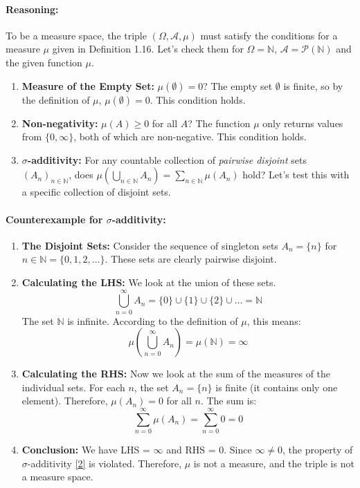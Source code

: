 \documentclass[11pt,a4paper]{article}
\begin{document}
\paragraph{Reasoning:}
To be a measure space, the triple $(\Omega, \mathcal{A}, \mu)$ must satisfy the conditions for a measure $\mu$ given in Definition 1.16. Let's check them for $\Omega=\mathbb{N}$, $\mathcal{A}=\mathcal{P}(\mathbb{N})$ and the given function $\mu$.
\begin{enumerate}
    \item \textbf{Measure of the Empty Set:} $\mu(\emptyset) = 0$? The empty set $\emptyset$ is finite, so by the definition of $\mu$, $\mu(\emptyset) = 0$. This condition holds.
    \item \textbf{Non-negativity:} $\mu(A) \geq 0$ for all $A$? The function $\mu$ only returns values from $\{0, \infty\}$, both of which are non-negative. This condition holds.
    \item \textbf{$\sigma$-additivity:} For any countable collection of \emph{pairwise disjoint} sets $(A_n)_{n \in \mathbb{N}}$, does $\mu(\bigcup_{n \in \mathbb{N}} A_n) = \sum_{n \in \mathbb{N}} \mu(A_n)$ hold? Let's test this with a specific collection of disjoint sets.
\end{enumerate}

\paragraph{Counterexample for $\sigma$-additivity:}
\begin{enumerate}
    \item \textbf{The Disjoint Sets:} Consider the sequence of singleton sets $A_n = \{n\}$ for $n \in \mathbb{N} = \{0, 1, 2, \dots\}$. These sets are clearly pairwise disjoint.

    \item \textbf{Calculating the LHS:} We look at the union of these sets.
    \[
        \bigcup_{n=0}^{\infty} A_n = \{0\} \cup \{1\} \cup \{2\} \cup \dots = \mathbb{N}
    \]
    The set $\mathbb{N}$ is infinite. According to the definition of $\mu$, this means:
    \[
        \mu\left(\bigcup_{n=0}^{\infty} A_n\right) = \mu(\mathbb{N}) = \infty
    \]

    \item \textbf{Calculating the RHS:} Now we look at the sum of the measures of the individual sets. For each $n$, the set $A_n = \{n\}$ is finite (it contains only one element). Therefore, $\mu(A_n) = 0$ for all $n$. The sum is:
    \[
        \sum_{n=0}^{\infty} \mu(A_n) = \sum_{n=0}^{\infty} 0 = 0
    \]

    \item \textbf{Conclusion:} We have LHS = $\infty$ and RHS = 0. Since $\infty \neq 0$, the property of $\sigma$-additivity \hyperlink{note2}{[2]} is violated. Therefore, $\mu$ is not a measure, and the triple is not a measure space.
\end{enumerate}
\end{document}
